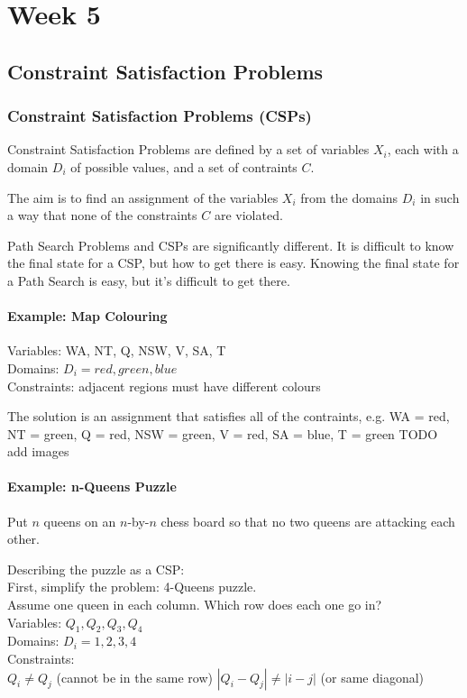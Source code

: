 \part{Week 5}
\chapter{Constraint Satisfaction Problems}

\section{Constraint Satisfaction Problems (CSPs)}
Constraint Satisfaction Problems are defined by a set of variables $X_i$, each
with a domain $D_i$ of possible values, and a set of contraints $C$.

The aim is to find an assignment of the variables $X_i$ from the domains $D_i$
in such a way that none of the constraints $C$ are violated.

Path Search Problems and CSPs are significantly different. It is difficult to
know the final state for a CSP, but how to get there is easy. Knowing the final
state for a Path Search is easy, but it's difficult to get there.

\subsection{Example: Map Colouring}
Variables: WA, NT, Q, NSW, V, SA, T\\
Domains: $D_i = {red, green, blue}$\\
Constraints: adjacent regions must have different colours

The solution is an assignment that satisfies all of the contraints, e.g. {WA =
red, NT = green, Q = red, NSW = green, V = red, SA = blue, T = green}
TODO add images

\subsection{Example: n-Queens Puzzle}
Put $n$ queens on an $n$-by-$n$ chess board so that no two queens are attacking
each other.

Describing the puzzle as a CSP:\\
First, simplify the problem: 4-Queens puzzle.\\
Assume one queen in each column. Which row does each one go in?\\
Variables: $Q_1, Q_2, Q_3, Q_4$\\
Domains: $D_i = {1, 2, 3, 4}$\\
Constraints:\\
$Q_i \neq Q_j$ (cannot be in the same row)
$|Q_i - Q_j| \neq |i - j|$ (or same diagonal)

